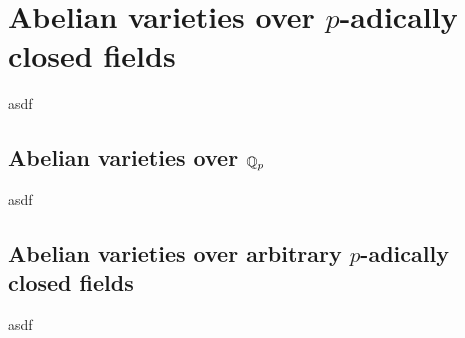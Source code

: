 \chapter{Abelian varieties over $p$-adically closed fields}
asdf

\section{Abelian varieties over $\mathbb{Q}_p$}
asdf

\section{Abelian varieties over arbitrary $p$-adically closed fields}
asdf
\cite[Exercise 2.1.20(a)]{BrunsHerzog-CM_rings}